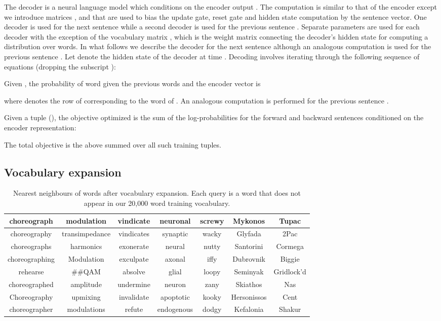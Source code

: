 \documentclass{article} \usepackage{nips15submit_e,times}
\begin{document}
 The decoder is a neural language model which conditions on the encoder output . The computation is similar to that of the encoder except we introduce matrices ,  and  that are used to bias the update gate, reset gate and hidden state computation by the sentence vector. One decoder is used for the next sentence  while a second decoder is used for the previous sentence . Separate parameters are used for each decoder with the exception of the vocabulary matrix , which is the weight matrix connecting the decoder's hidden state for computing a distribution over words. In what follows we describe the decoder for the next sentence  although an analogous computation is used for the previous sentence . Let  denote the hidden state of the decoder at time . Decoding involves iterating through the following sequence of equations (dropping the subscript ):

Given , the probability of word  given the previous  words and the encoder vector is

where  denotes the row of  corresponding to the word of . An analogous computation is performed for the previous sentence .

 Given a tuple (), the objective optimized is the sum of the log-probabilities for the forward and backward sentences conditioned on the encoder representation:

The total objective is the above summed over all such training tuples.


\subsection{Vocabulary expansion}


\begin{table}
\small
\centering
\begin{tabular}{c|c|c|c|c|c|c}
\toprule \bf choreograph & \bf modulation & \bf vindicate & \bf neuronal & \bf screwy & \bf Mykonos & \bf Tupac \\ \midrule
choreography & transimpedance & vindicates & synaptic & wacky & Glyfada & 2Pac \\
choreographs & harmonics &  exonerate & neural & nutty & Santorini & Cormega \\
choreographing & Modulation &  exculpate & axonal & iffy & Dubrovnik & Biggie \\
rehearse &  \#\#QAM & absolve &  glial & loopy & Seminyak & Gridlock'd \\
choreographed & amplitude & undermine & neuron & zany & Skiathos & Nas \\
Choreography & upmixing & invalidate &  apoptotic & kooky & Hersonissos & Cent \\
choreographer & modulations &  refute &  endogenous & dodgy & Kefalonia & Shakur \\ \bottomrule

\end{tabular}
\caption{Nearest neighbours of words after vocabulary expansion. Each query is a word that does not appear in our 20,000 word training vocabulary. }
\label{tab:nnwords}
\end{table}
\end{document}
